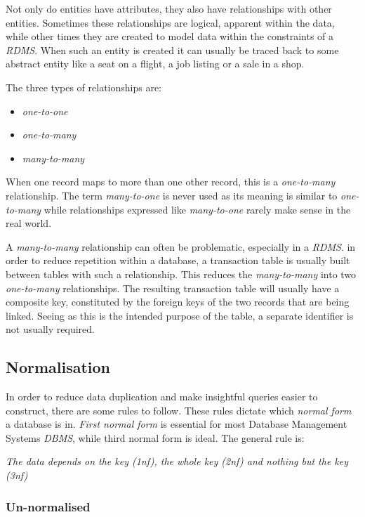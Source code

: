 \documentclass[9pt]{article}
\begin{document}
Not only do entities have attributes, they also have relationships with other entities. Sometimes these relationships are logical, apparent within the data, while other times they are created to model data within the constraints of a \emph{RDMS}. When such an entity is created it can usually be traced back to some abstract entity like a seat on a flight, a job listing or a sale in a shop.

The three types of relationships are:

\begin{itemize}
\item \emph{one-to-one}
\item \emph{one-to-many}
\item \emph{many-to-many}
\end{itemize}

When one record maps to more than one other record, this is a \emph{one-to-many} relationship. The term \emph{many-to-one} is never used as its meaning is similar to \emph{one-to-many} while relationships expressed like \emph{many-to-one} rarely make sense in the real world.

A \emph{many-to-many} relationship can often be problematic, especially in a \emph{RDMS}. in order to reduce repetition within a database, a transaction table is usually built between tables with such a relationship. This reduces the \emph{many-to-many} into two \emph{one-to-many} relationships. The resulting transaction table will usually have a composite key, constituted by the foreign keys of the two records that are being linked. Seeing as this is the intended purpose of the table, a separate identifier is not usually required.

\subsection{Normalisation}
\label{sec:org6c39d0e}

In order to reduce data duplication and make insightful queries easier to construct, there are some rules to follow. These rules dictate which \emph{normal form} a database is in. \emph{First normal form} is essential for most Database Management Systems \emph{DBMS}, while third normal form is ideal. The general rule is:

\emph{The data depends on the key (1nf), the whole key (2nf) and nothing but the key (3nf)}

\subsubsection{Un-normalised}
\label{sec:org8cba4c1}
\end{document}
